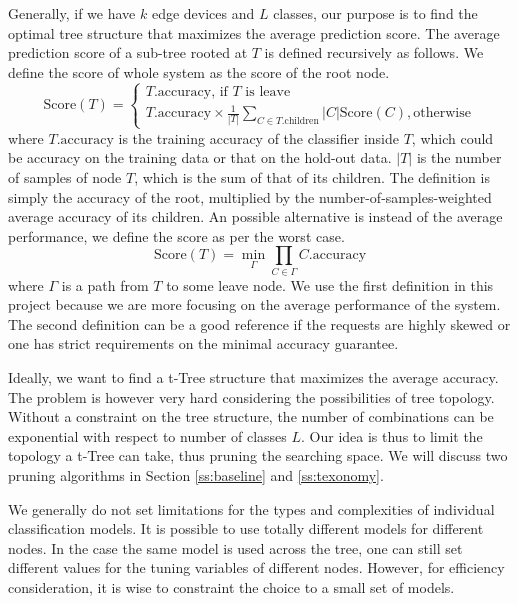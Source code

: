 \documentclass{article}
\begin{document}
Generally, if we have $k$ edge devices and $L$ classes, our purpose is to find the optimal tree structure that maximizes the average prediction score. The average prediction score of a sub-tree rooted at $T$ is defined recursively as follows. We define the score of whole system as the score of the root node.
\begin{equation}\label{eq:score}
\text{Score}(T)=\left\{
                \begin{array}{ll}
                  T.\text{accuracy, if $T$ is leave}\\
                  T.\text{accuracy}\times \frac{1}{|T|}\sum_{C\in T.\text{children}}|C|\text{Score}(C), \text{otherwise}
                \end{array}
              \right.
\end{equation}
where $T.\text{accuracy}$ is the training accuracy of the classifier inside $T$, which could be accuracy on the training data or that on the hold-out data. $|T|$ is the number of samples of node $T$, which is the sum of that of its children. The definition is simply the accuracy of the root, multiplied by the number-of-samples-weighted average accuracy of its children. An possible alternative is instead of the average performance, we define the score as per the worst case. 
\begin{equation} \label{eq:score2}
\text{Score}(T) = \min_\Gamma{\prod_{C\in \Gamma}C.\text{accuracy}}
\end{equation}
where $\Gamma$ is a path from $T$ to some leave node. We use the first definition in this project because we are more focusing on the average performance of the system. The second definition can be a good reference if the requests are highly skewed or one has strict requirements on the minimal accuracy guarantee.

Ideally, we want to find a t-Tree structure that maximizes the average accuracy. The problem is however very hard considering the possibilities of tree topology. Without a constraint on the tree structure, the number of combinations can be exponential with respect to number of classes $L$. Our idea is thus to limit the topology a t-Tree can take, thus pruning the searching space. We will discuss two pruning algorithms in Section \ref{ss:baseline} and
\ref{ss:texonomy}.

We generally do not set limitations for the types and complexities of individual classification models. It is possible to use totally different models for different nodes. In the case the same model is used across the tree, one can still set different values for the tuning variables of different nodes. However, for efficiency consideration, it is wise to constraint the choice to a small set of models.
\end{document}
